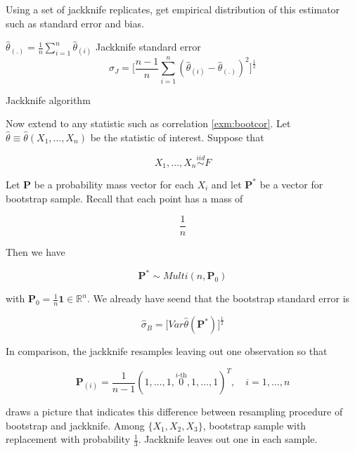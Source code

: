 \documentclass[]{book}
\theoremstyle{definition}
\theoremstyle{definition}
\theoremstyle{definition}
\theoremstyle{remark}
\begin{document}
Using a set of jackknife replicates, get empirical distribution of this estimator such as standard error and bias.

\begin{algorithm}[H] \label{alg:algjack}
  \SetAlgoLined
  $\hat\theta_{(.)} = \frac{1}{n} \sum\limits_{i = 1}^n \hat\theta_{(i)}$\;
  Jackknife standard error $$\hat\sigma_J = \bigg[ \frac{n - 1}{n} \sum_{i = 1}^n (\hat\theta_{(i)} - \hat\theta_{(.)})^2 \bigg]^{\frac{1}{2}}$$\;
  \caption{Jackknife algorithm}
\end{algorithm}

Now extend to any statistic such as correlation \ref{exm:bootcor}. Let \(\hat\theta \equiv \hat\theta(X_1, \ldots, X_n)\) be the statistic of interest. Suppose that

\[X_1, \ldots, X_n \stackrel{iid}{\sim}F\]

Let \(\mathbf{P}\) be a probability mass vector for each \(X_i\) and let \(\mathbf{P}^{\ast}\) be a vector for bootstrap sample. Recall that each point has a mass of

\[\frac{1}{n}\]

Then we have

\[\mathbf{P}^{\ast} \sim Multi(n, \mathbf{P}_0)\]

with \(\mathbf{P}_0 = \frac{1}{n}\mathbf{1} \in \mathbb{R}^n\). We already have seend that the bootstrap standard error is

\[\hat\sigma_B = \Big[ Var \hat\theta(\mathbf{P}^{\ast}) \Big]^{\frac{1}{2}}\]

In comparison, the jackknife resamples leaving out one observation so that

\[\mathbf{P}_{(i)} = \frac{1}{n - 1} (1, \ldots, 1, \overset{i\text{-th}}{0}, 1, \ldots, 1)^T, \quad i = 1, \ldots, n\]

\citet{Efron:1983bw} draws a picture that indicates this difference between resampling procedure of bootstrap and jackknife. Among \(\{ X_1, X_2, X_3 \}\), bootstrap sample with replacement with probability \(\frac{1}{3}\). Jackknife leaves out one in each sample.
\end{document}
